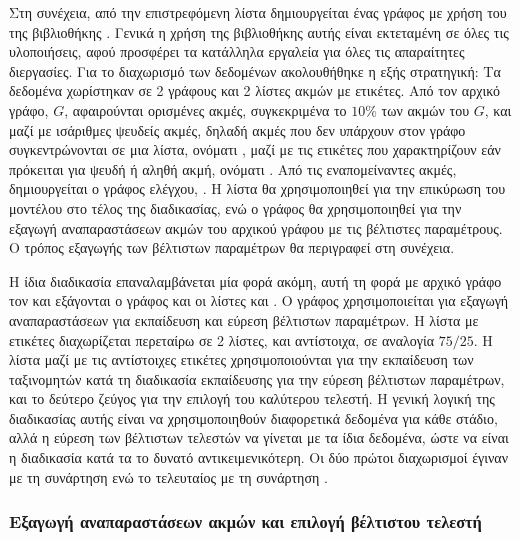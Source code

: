 Στη συνέχεια, από την επιστρεφόμενη λίστα δημιουργείται ένας γράφος με χρήση του 
της βιβλιοθήκης  \cite{StellarGraph}. Γενικά η χρήση της βιβλιοθήκης αυτής είναι
εκτεταμένη σε όλες τις υλοποιήσεις, αφού προσφέρει τα κατάλληλα εργαλεία για όλες τις απαραίτητες
διεργασίες. Για το διαχωρισμό των δεδομένων ακολουθήθηκε η εξής στρατηγική: Τα δεδομένα 
χωρίστηκαν σε 2 γράφους και 2 λίστες ακμών με ετικέτες. Από τον αρχικό γράφο, \(G\), αφαιρούνται
ορισμένες ακμές, συγκεκριμένα το \(10\%\) των ακμών του \(G\), και μαζί με ισάριθμες ψευδείς
ακμές, δηλαδή ακμές που δεν υπάρχουν στον γράφο συγκεντρώνονται σε μια λίστα, 
ονόματι , μαζί με τις ετικέτες που χαρακτηρίζουν εάν πρόκειται για ψευδή ή
αληθή ακμή, ονόματι . Από τις εναπομείναντες ακμές, δημιουργείται ο γράφος
ελέγχου, . Η λίστα  θα χρησιμοποιηθεί για την επικύρωση του 
μοντέλου στο τέλος της διαδικασίας, ενώ ο γράφος  θα χρησιμοποιηθεί για την εξαγωγή
αναπαραστάσεων ακμών του αρχικού γράφου με τις βέλτιστες παραμέτρους. Ο τρόπος εξαγωγής των 
βέλτιστων παραμέτρων θα περιγραφεί στη συνέχεια. 

Η ίδια διαδικασία
επαναλαμβάνεται μία φορά ακόμη, αυτή τη φορά με αρχικό γράφο τον  και εξάγονται ο
γράφος  και οι λίστες  και . Ο γράφος 
χρησιμοποιείται για εξαγωγή  αναπαραστάσεων για εκπαίδευση και εύρεση βέλτιστων παραμέτρων.
Η λίστα  με ετικέτες  διαχωρίζεται περεταίρω σε 2 λίστες, 
 και 
αντίστοιχα, σε αναλογία \(75/25\). Η λίστα  μαζί με τις αντίστοιχες ετικέτες
 χρησιμοποιούνται για την εκπαίδευση των ταξινομητών κατά τη διαδικασία
εκπαίδευσης για την εύρεση βέλτιστων παραμέτρων, και το δεύτερο ζεύγος για την επιλογή του 
καλύτερου τελεστή. Η γενική λογική της διαδικασίας αυτής είναι να χρησιμοποιηθούν διαφορετικά
δεδομένα για κάθε στάδιο, αλλά η εύρεση των βέλτιστων τελεστών να γίνεται με τα ίδια 
δεδομένα, ώστε να είναι η διαδικασία κατά τα το δυνατό αντικειμενικότερη. Οι δύο πρώτοι
διαχωρισμοί έγιναν με τη συνάρτηση 
ενώ το τελευταίος με τη συνάρτηση  
\cite{scikit-learn}.

\subsubsection{Εξαγωγή αναπαραστάσεων ακμών και επιλογή βέλτιστου τελεστή}

